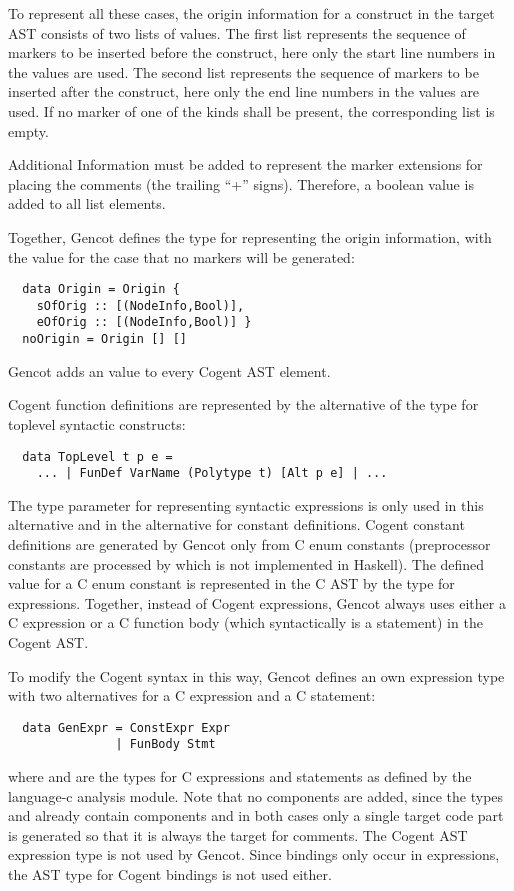 To represent all these cases, the origin information for a construct in the target AST consists of two lists of 
values. The first list represents the sequence of  markers to be inserted before the construct, here only the
start line numbers in the  values are used. The second list represents the sequence of  markers 
to be inserted after the construct, here only the end line numbers in the  values are used. If no marker of
one of the kinds shall be present, the corresponding list is empty.

Additional Information must be added to represent the marker extensions for placing the comments (the trailing ``+'' signs).
Therefore, a boolean value is added to all list elements.

Together, Gencot defines the type  for representing the origin information, with the value 
for the case that no markers will be generated:
\begin{verbatim}
  data Origin = Origin { 
    sOfOrig :: [(NodeInfo,Bool)], 
    eOfOrig :: [(NodeInfo,Bool)] } 
  noOrigin = Origin [] []
\end{verbatim}
Gencot adds an  value to every Cogent AST element.

Cogent function definitions are represented by the  alternative of the type for toplevel syntactic constructs:

\begin{verbatim}
  data TopLevel t p e = 
    ... | FunDef VarName (Polytype t) [Alt p e] | ...
\end{verbatim}
The type parameter  for representing syntactic expressions is only used in this alternative and in the alternative
for constant definitions. Cogent constant definitions are generated by Gencot only from C enum constants (preprocessor
constants are processed by  which is not implemented in Haskell). The defined value for a C enum
constant is represented in the C AST by the type for expressions. Together, instead of Cogent expressions, Gencot always
uses either a C expression or a C function body (which syntactically is a statement) in the Cogent AST. 

To modify the Cogent syntax in this way, Gencot defines an own expression type with two alternatives for a C expression 
and a C statement:
\begin{verbatim}
  data GenExpr = ConstExpr Expr
               | FunBody Stmt
\end{verbatim}
where  and  are the types for C expressions and statements as defined by the language-c analysis
module. Note that no  components are added, since the types  and  already contain
 components and in both cases only a single target code part is generated so that it is always the
target for comments. The Cogent AST expression type is not used by Gencot. Since bindings only occur in expressions,
the AST type for Cogent bindings is not used either.

